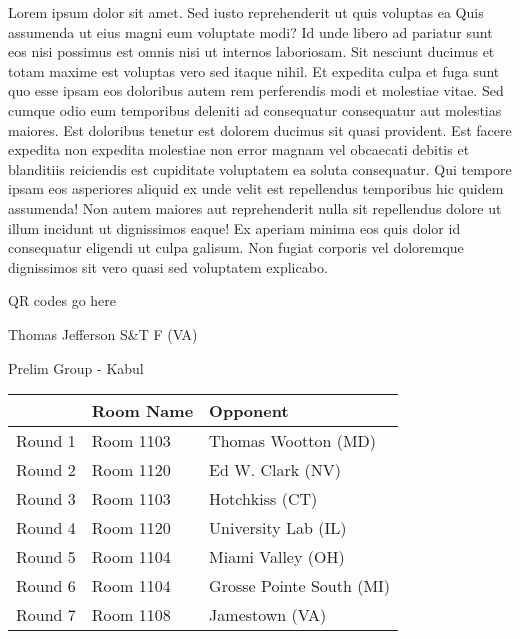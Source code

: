 \documentclass{article}%
\begin{document}
\vspace*{8pt}%
\linebreak%
\newline%
\newline%
Lorem ipsum dolor sit amet. Sed iusto reprehenderit ut quis voluptas ea Quis assumenda ut eius magni eum voluptate modi? Id unde libero ad pariatur sunt eos nisi possimus est omnis nisi ut internos laboriosam. Sit nesciunt ducimus et totam maxime est voluptas vero sed itaque nihil. Et expedita culpa et fuga sunt quo esse ipsam eos doloribus autem rem perferendis modi et molestiae vitae.\newline%
\newline%
Sed cumque odio eum temporibus deleniti ad consequatur consequatur aut molestias maiores. Est doloribus tenetur est dolorem ducimus sit quasi provident. Est facere expedita non expedita molestiae non error magnam vel obcaecati debitis et blanditiis reiciendis est cupiditate voluptatem ea soluta consequatur. Qui tempore ipsam eos asperiores aliquid ex unde velit est repellendus temporibus hic quidem assumenda!\newline%
\newline%
Non autem maiores aut reprehenderit nulla sit repellendus dolore ut illum incidunt ut dignissimos eaque! Ex aperiam minima eos quis dolor id consequatur eligendi ut culpa galisum. Non fugiat corporis vel doloremque dignissimos sit vero quasi sed voluptatem explicabo.\newline%
\newline%
%
\vspace*{30pt}%
\begin{center}%
\begin{Huge}%
QR codes go here%
\end{Huge}%
\end{center}%
\newpage%
%
\begin{center}%
\begin{Huge}%
Thomas Jefferson S\&T F (VA)%
\end{Huge}%
\vspace*{8pt}%
\linebreak%
\begin{Large}%
Prelim Group {-} Kabul%
\end{Large}%
\end{center}%
\begin{tabularx}{\textwidth}{|c|Y|Y|}%
\hline%
&Room Name&Opponent\\%
\hline%
Round 1&Room 1103&Thomas Wootton (MD)\\%
Round 2&Room 1120&Ed W. Clark (NV)\\%
Round 3&Room 1103&Hotchkiss (CT)\\%
Round 4&Room 1120&University Lab (IL)\\%
Round 5&Room 1104&Miami Valley (OH)\\%
Round 6&Room 1104&Grosse Pointe South (MI)\\%
Round 7&Room 1108&Jamestown (VA)\\%
\hline%
\end{tabularx}%
\end{document}
